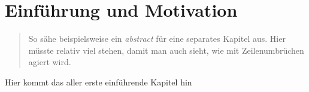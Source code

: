 


\chapter{Einführung und Motivation}

\begin{quote}
    So sähe beispielsweise ein \textit{abstract} für eine separates Kapitel aus. Hier müsste relativ viel stehen, damit man
    auch sieht, wie mit Zeilenumbrüchen agiert wird.
\end{quote}
Hier kommt das aller erste einführende Kapitel hin \cite{fitzgerald:realigning_research_and_practice}

